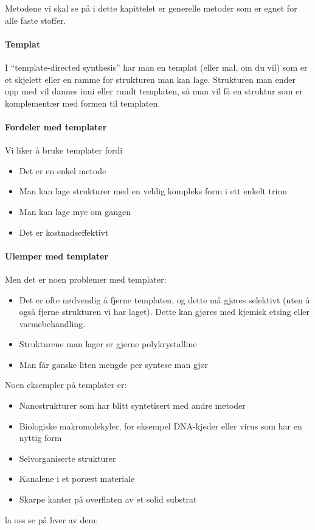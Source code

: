 Metodene vi skal se på i dette kapittelet er generelle metoder som er egnet for alle faste stoffer.

\paragraph{Templat} I ``template-directed synthesis'' har man en templat (eller mal, om du vil) som er et skjelett eller en ramme for strukturen man kan lage. Strukturen man ender opp med vil dannes inni eller rundt templaten, så man vil få en struktur som er komplementær med formen til templaten. 

\paragraph{Fordeler med templater} Vi liker å bruke templater fordi
\begin{itemize}
	\item Det er en enkel metode
	\item Man kan lage strukturer med en veldig kompleks form i ett enkelt trinn
	\item Man kan lage mye om gangen
	\item Det er kostnadseffektivt
\end{itemize}

\paragraph{Ulemper med templater} Men det er noen problemer med templater:
\begin{itemize}
	\item Det er ofte nødvendig å fjerne templaten, og dette må gjøres selektivt (uten å også fjerne strukturen vi har laget). Dette kan gjøres med kjemisk etsing eller varmebehandling.
	\item Strukturene man lager er gjerne polykrystalline
	\item Man får ganske liten mengde per syntese man gjør %
\end{itemize}

Noen eksempler på templater er:
\begin{itemize}
	\item Nanostrukturer som har blitt syntetisert med andre metoder
	\item Biologiske makromolekyler, for eksempel DNA-kjeder eller virus som har en nyttig form
	\item Selvorganiserte strukturer
	\item Kanalene i et poræst materiale
	\item Skarpe kanter på overflaten av et solid substrat
\end{itemize}
la oss se på hver av dem:


